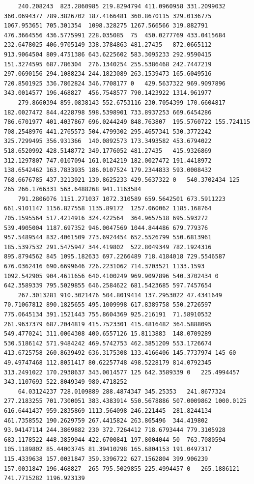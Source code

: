\documentclass[UTF8]{ctexart}
\begin{document}
\begin{lstlisting}
	240.208243	823.2860985	219.8294794	411.0960958	331.2099032	360.0694377	789.3826702	187.4166481	360.8670115	329.0136775	1067.953651	705.301354	1098.328275	1267.566566	319.882791	476.3664556	436.5775991	228.035085	75	450.0277769	433.0415684	232.6478025	406.9705149	338.3784863	481.27435	872.0665112	913.9064504	809.4751386	643.6225602	583.3095233	292.9590415	151.3274595	687.786304	276.1340254	255.5386468	242.7447219	297.0690156	294.1088234	244.1823089	263.1539473	165.6049516	720.8501925	336.7862824	346.7708177	0	429.5637322	969.9097896	343.0014577	196.468827	456.7548577	790.1423922	1314.961977
	279.8660394	859.0838143	552.6753116	230.7054399	170.6604817	182.0027472	844.4228798	598.5398901	733.8937253	669.6454286	786.6701977	401.4037867	696.0244249	848.763807	195.5760722	155.724115	708.2548976	441.2765573	504.4799302	295.4657341	530.3772242	325.7299495	356.931366	140.0892573	173.3493582	453.6794022	518.6520992	428.5148772	349.1776052	481.27435	415.9326869	312.1297807	747.0107094	161.0124219	182.0027472	191.4418972	138.6542462	163.7833935	186.0107524	179.2344833	593.0008432	768.6676785	437.3213921	130.8625233	429.5637322	0	540.3702434	125	265	266.1766331	563.6488268	941.1163584
	791.2806076	1151.271037	1072.310589	659.5642501	673.5911223	661.9101147	1156.827558	1135.89172	1257.060062	1185.168764	705.1595564	517.4214916	324.422564	364.9657518	695.593272	539.4905004	1187.697352	946.0047569	1044.844486	679.779376	957.5489544	832.4061509	773.6924454	652.5526799	550.6813961	185.5397532	291.5475947	344.419802	522.8049349	782.1924316	895.8794562	845	1095.182633	697.2266489	718.4184018	729.5546587	676.0362416	690.6699646	726.2231062	714.3703521	1133.1593	1092.542905	904.4611656	640.4100249	969.9097896	540.3702434	0	642.3589339	795.5029855	646.2584622	681.5423685	597.7457654
	267.3013281	910.3021476	504.8019414	137.2953022	47.4341649	70.71067812	890.1825655	495.1009998	617.8389758	550.2726597	775.0645134	391.1521443	755.8604369	925.216191	71.58910532	261.9637379	687.2044819	415.7523301	415.4816482	364.5888095	549.4770241	311.0064308	400.6557126	15.8113883	148.0709289	530.5186142	571.9484242	469.5742753	462.3851209	553.1726674	413.6725758	260.8639492	636.3175308	133.4166406	145.7737974	145	60	49.49747468	112.8051417	80.62257748	498.5228179	814.0792345	313.2491022	170.2938637	343.0014577	125	642.3589339	0	225.4994457	343.1107693	522.8049349	980.4718252
	64.03124237	728.0109889	288.4874347	345.25353	241.8677324	277.2183255	701.7300051	383.4383914	550.5678886	507.0009862	1000.0125	616.6441437	959.2835869	1113.564098	246.221445	281.8244134	461.7358552	190.2629759	267.4415824	263.865496	344.419802	93.94147114	244.3869882	230	372.7264412	718.6793444	779.3105928	683.1178522	448.3859944	422.6700841	197.8004044	50	763.7080594	105.1189802	85.44003745	81.39410298	165.6804153	191.0497317	115.4339638	157.0031847	359.3396722	627.1562804	399.906239	157.0031847	196.468827	265	795.5029855	225.4994457	0	265.1886121	741.7715282	1196.923139

\end{lstlisting}
\end{document}
